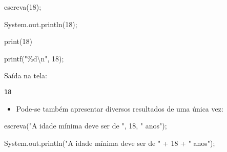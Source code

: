 \documentclass[
  letterpaper,
  DIV=11,
  numbers=noendperiod]{scrreprt}
\newenvironment{Shaded}{\begin{snugshade}}{\end{snugshade}}
\newcommand{\AttributeTok}[1]{\textcolor[rgb]{0.40,0.45,0.13}{#1}}
\newcommand{\BuiltInTok}[1]{\textcolor[rgb]{0.00,0.23,0.31}{#1}}
\newcommand{\DecValTok}[1]{\textcolor[rgb]{0.68,0.00,0.00}{#1}}
\newcommand{\FunctionTok}[1]{\textcolor[rgb]{0.28,0.35,0.67}{#1}}
\newcommand{\NormalTok}[1]{\textcolor[rgb]{0.00,0.23,0.31}{#1}}
\newcommand{\OperatorTok}[1]{\textcolor[rgb]{0.37,0.37,0.37}{#1}}
\newcommand{\SpecialCharTok}[1]{\textcolor[rgb]{0.37,0.37,0.37}{#1}}
\newcommand{\StringTok}[1]{\textcolor[rgb]{0.13,0.47,0.30}{#1}}
\providecommand{\tightlist}{%
  \setlength{\itemsep}{0pt}\setlength{\parskip}{0pt}}\usepackage{longtable,booktabs,array}
\begin{document}
\begin{Shaded}
\begin{Highlighting}[]
\NormalTok{escreva}\OperatorTok{(}\DecValTok{18}\OperatorTok{);}
\end{Highlighting}
\end{Shaded}

\begin{Shaded}
\begin{Highlighting}[]
\NormalTok{System}\OperatorTok{.}\AttributeTok{out}\OperatorTok{.}\FunctionTok{println}\NormalTok{(}\DecValTok{18}\NormalTok{)}\OperatorTok{;}
\end{Highlighting}
\end{Shaded}

\begin{Shaded}
\begin{Highlighting}[]
\BuiltInTok{print}\NormalTok{(}\DecValTok{18}\NormalTok{)}
\end{Highlighting}
\end{Shaded}

\begin{Shaded}
\begin{Highlighting}[]
\NormalTok{printf}\OperatorTok{(}\StringTok{"}\SpecialCharTok{\%d\textbackslash{}n}\StringTok{"}\OperatorTok{,} \DecValTok{18}\OperatorTok{);}
\end{Highlighting}
\end{Shaded}

Saída na tela:

\begin{verbatim}
18
\end{verbatim}

\begin{itemize}
\tightlist
\item
  Pode-se também apresentar diversos resultados de uma única vez:
\end{itemize}

\begin{Shaded}
\begin{Highlighting}[]
\NormalTok{escreva}\OperatorTok{(}\StringTok{"A idade mínima deve ser de "}\OperatorTok{,} \DecValTok{18}\OperatorTok{,} \StringTok{" anos"}\OperatorTok{);}
\end{Highlighting}
\end{Shaded}

\begin{Shaded}
\begin{Highlighting}[]
\NormalTok{System}\OperatorTok{.}\AttributeTok{out}\OperatorTok{.}\FunctionTok{println}\NormalTok{(}\StringTok{"A idade mínima deve ser de "} \OperatorTok{+} \DecValTok{18} \OperatorTok{+} \StringTok{" anos"}\NormalTok{)}\OperatorTok{;}
\end{Highlighting}
\end{Shaded}
\end{document}
